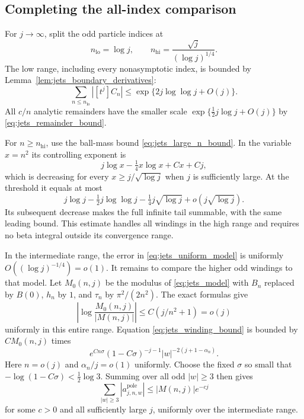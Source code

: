 \documentclass[11pt]{article}
\numberwithin{equation}{section}
\theoremstyle{definition}
\begin{document}
\subsection{Completing the all-index comparison}

For $j\to\infty$, split the odd particle indices at
\[
 n_{\mathrm{lo}}=\log j,\qquad
 n_{\mathrm{hi}}=\frac{\sqrt j}{(\log j)^{1/4}}.
\]
The low range, including every nonasymptotic index, is bounded by
Lemma~\ref{lem:jets_boundary_derivatives}:
\begin{equation}\label{eq:jets_low_range}
 \sum_{n\le n_{\mathrm{lo}}}|[t^j]C_n|
 \le\exp\{2j\log\log j+O(j)\}.
\end{equation}
All $c/n$ analytic remainders have the smaller scale
$\exp\{\tfrac12j\log j+O(j)\}$ by
\eqref{eq:jets_remainder_bound}.

For $n\ge n_{\mathrm{hi}}$, use the ball-mass bound
\eqref{eq:jets_large_n_bound}. In the variable $x=n^2$ its
controlling exponent is
\[
 j\log x-\tfrac14x\log x+Cx+Cj,
\]
which is decreasing for every $x\ge j/\sqrt{\log j}$ when $j$
is sufficiently large. At the threshold it equals at most
\begin{equation}\label{eq:jets_high_range}
 j\log j-\tfrac12j\log\log j-\tfrac14j\sqrt{\log j}
       +o(j\sqrt{\log j}).
\end{equation}
Its subsequent decrease makes the full infinite tail summable,
with the same leading bound. This estimate handles all windings in
the high range and requires no beta integral outside its
convergence range.

In the intermediate range, the error in
\eqref{eq:jets_uniform_model} is uniformly
$O((\log j)^{-1/4})=o(1)$. It remains to compare the higher odd
windings to that model. Let $M_0(n,j)$ be the modulus of
\eqref{eq:jets_model} with $B_n$ replaced by $B(0)$, $h_n$ by
$1$, and $\tau_n$ by $\pi^2/(2n^2)$. The exact formulas give
\begin{equation}\label{eq:jets_baseline_ratio}
 \left|\log\frac{M_0(n,j)}{|M(n,j)|}\right|
 \le C(j/n^2+1)=o(j)
\end{equation}
uniformly in this entire range. Equation
\eqref{eq:jets_winding_bound} is bounded by $CM_0(n,j)$ times
\[
 e^{Cn\sigma}(1-C\sigma)^{-j-1}
 |w|^{-2(j+1-\alpha_n)}.
\]
Here $n=o(j)$ and $\alpha_n/j=o(1)$ uniformly. Choose the fixed
$\sigma$ so small that $-\log(1-C\sigma)<\tfrac12\log3$.
Summing over all odd $|w|\ge3$ then gives
\begin{equation}\label{eq:jets_higher_windings_negligible}
 \sum_{|w|\ge3}|a_{j,n,w}^{\mathrm{pole}}|
 \le |M(n,j)|e^{-c j}
\end{equation}
for some $c>0$ and all sufficiently large $j$, uniformly over the
intermediate range.
\end{document}
